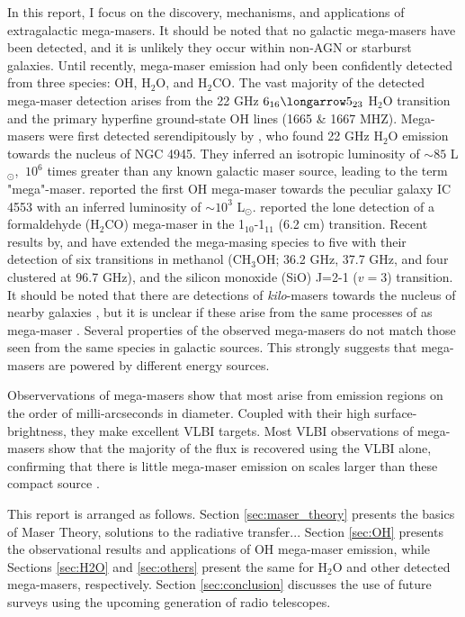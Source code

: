 In this report, I focus on the discovery, mechanisms, and applications of extragalactic mega-masers. It should be noted that no galactic mega-masers have been detected, and it is unlikely they occur within non-AGN or starburst galaxies. Until recently, mega-maser emission had only been confidently detected from three species: OH, H$_2$O, and H$_2$CO. The vast majority of the detected mega-maser detection arises from the 22 GHz $6_{16} \longarrow 5_{23}$ H$_2$O transition and the primary hyperfine ground-state OH lines (1665 \& 1667 MHZ). Mega-masers were first detected serendipitously by \citet{DOS_SANTOS_1979}, who found 22 GHz H$_2$O emission towards the nucleus of NGC 4945. They inferred an isotropic luminosity of $\sim 85$ L$_{\odot}$, $~10^6$ times greater than any known galactic maser source, leading to the term "mega"-maser. \citet{Baan_1982} reported the first OH mega-maser towards the peculiar galaxy IC 4553 with an inferred luminosity of $\sim10^3$ L$_{\odot}$. \citet{baan1986} reported the lone detection of a formaldehyde (H$_2$CO) mega-maser in the 1$_{10}$-1$_{11}$ (6.2 cm) transition. Recent results by, \citet{wang2014} and \citet{chen2015} have extended the mega-masing species to five with their detection of six transitions in methanol (CH$_3$OH; 36.2 GHz, 37.7 GHz, and four clustered at 96.7 GHz), and the silicon monoxide (SiO) J=2-1  ($v=3$) transition. It should be noted that there are detections of {\it kilo}-masers towards the nucleus of nearby galaxies \citep[e.g.,]{Ho_1987}, but it is unclear if these arise from the same processes of as mega-maser \citep{lo2005}. Several properties of the observed mega-masers do not match those seen from the same species in galactic sources. This strongly suggests that mega-masers are powered by different energy sources.

Observervations of mega-masers show that most arise from emission regions on the order of milli-arcseconds in diameter. Coupled with their high surface-brightness, they make excellent VLBI targets. Most VLBI observations of mega-masers show that the majority of the flux is recovered using the VLBI alone, confirming that there is little mega-maser emission on scales larger than these compact source \citep{lo2005}.

This report is arranged as follows. Section \ref{sec:maser_theory} presents the basics of Maser Theory, solutions to the radiative transfer... Section \ref{sec:OH} presents the observational results and applications of OH mega-maser emission, while Sections \ref{sec:H2O} and \ref{sec:others} present the same for H$_2$O and other detected mega-masers, respectively. Section \ref{sec:conclusion} discusses the use of future surveys using the upcoming generation of radio telescopes.
